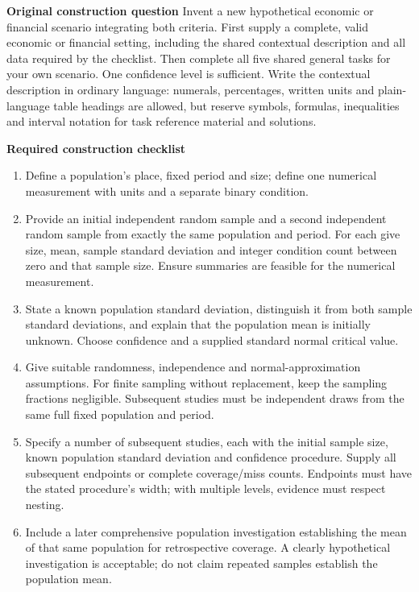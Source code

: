 \secInicio[][sec:p2]

\clearpage


\textbf{Original construction question}
Invent a new hypothetical economic or financial scenario integrating both criteria. First supply a complete, valid economic or financial setting, including the shared contextual description and all data required by the checklist. Then complete all five shared general tasks for your own scenario. One confidence level is sufficient. Write the contextual description in ordinary language: numerals, percentages, written units and plain-language table headings are allowed, but reserve symbols, formulas, inequalities and interval notation for task reference material and solutions.

\textbf{Required construction checklist}
\begin{enumerate}
\item Define a population's place, fixed period and size; define one numerical measurement with units and a separate binary condition.
\item Provide an initial independent random sample and a second independent random sample from exactly the same population and period. For each give size, mean, sample standard deviation and integer condition count between zero and that sample size. Ensure summaries are feasible for the numerical measurement.
\item State a known population standard deviation, distinguish it from both sample standard deviations, and explain that the population mean is initially unknown. Choose confidence and a supplied standard normal critical value.
\item Give suitable randomness, independence and normal-approximation assumptions. For finite sampling without replacement, keep the sampling fractions negligible. Subsequent studies must be independent draws from the same full fixed population and period.
\item Specify a number of subsequent studies, each with the initial sample size, known population standard deviation and confidence procedure. Supply all subsequent endpoints or complete coverage/miss counts. Endpoints must have the stated procedure's width; with multiple levels, evidence must respect nesting.
\item Include a later comprehensive population investigation establishing the mean of that same population for retrospective coverage. A clearly hypothetical investigation is acceptable; do not claim repeated samples establish the population mean.
\end{enumerate}

